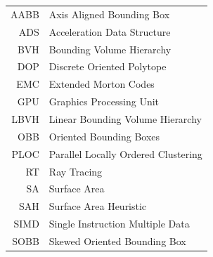\documentclass[english,master,oneside]{ctufit-thesis}
\begin{document}
\printonepageabstract 

\tableofcontents %
\listoffigures %
\begingroup
\let\clearpage\relax
\listoftables %
\thectufitlistingscommand{} %
\thectufitlistofalgorithmscommand{} %
\endgroup

\chapter{\thectufitabbreviationlabel}

\begin{tabular}{rl}
	AABB  & Axis Aligned Bounding Box                      \\
	ADS   & Acceleration Data Structure                    \\
    BVH   & Bounding Volume Hierarchy                      \\
	DOP   & Discrete Oriented Polytope                     \\
	EMC   & Extended Morton Codes                          \\
	GPU   & Graphics Processing Unit                       \\
    LBVH  & Linear Bounding Volume Hierarchy               \\
	OBB   & Oriented Bounding Boxes                        \\
	PLOC  & Parallel Locally Ordered Clustering            \\
	RT    & Ray Tracing                                    \\
	SA    & Surface Area                                   \\
	SAH   & Surface Area Heuristic                         \\
    SIMD  & Single Instruction Multiple Data               \\
	SOBB  & Skewed Oriented Bounding Box
\end{tabular}
\resumeTOCentries
\mainmatter\mainmatterinit %
\end{document}
